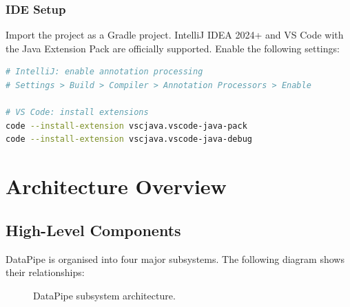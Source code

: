 \documentclass[
    language=english,
    doctype=manual,
    institution=none,
    titlestyle=book,
    oneside,
]{../../omnilatex}
\begin{document}
\subsection{IDE Setup}

Import the project as a Gradle project. IntelliJ IDEA 2024+ and VS Code
with the Java Extension Pack are officially supported. Enable the
following settings:

\begin{lstlisting}[language=bash, caption={Recommended IDE settings.}]
# IntelliJ: enable annotation processing
# Settings > Build > Compiler > Annotation Processors > Enable

# VS Code: install extensions
code --install-extension vscjava.vscode-java-pack
code --install-extension vscjava.vscode-java-debug
\end{lstlisting}

\chapter{Architecture Overview}
\label{sec:architecture}

\section{High-Level Components}

DataPipe is organised into four major subsystems. The following diagram
shows their relationships:

\begin{figure}[htbp]
    \centering
    \caption{DataPipe subsystem architecture.}
    \label{fig:subsystem-arch}
\end{figure}
\end{document}
